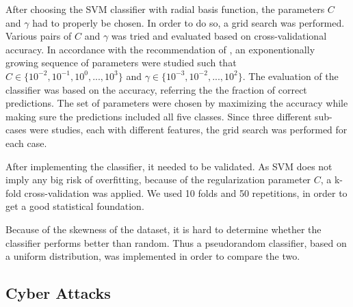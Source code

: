 After choosing the SVM classifier with radial basis function, the parameters $C$ and $\gamma$ had to properly be chosen. In order to do so, a grid search was performed. Various pairs of $C$ and $\gamma$ was tried and evaluated based on cross-validational accuracy. In accordance with the recommendation of \citet{Hsu10apractical}, an exponentionally growing sequence of parameters were studied such that $C\in\{10^{-2},10^{-1},10^{0},...,10^{3}\}$ and $\gamma\in\{10^{-3},10^{-2},...,10^{2}\}$. The evaluation of the classifier was based on the accuracy, referring the the fraction of correct predictions. The set of parameters were chosen by maximizing the accuracy while making sure the predictions included all five classes.
Since three different sub-cases were studies, each with different features, the grid search was performed for each case. 

After implementing the classifier, it needed to be validated. As SVM does not imply any big risk of overfitting, because of the regularization parameter $C$, a k-fold cross-validation was applied. We used 10 folds and 50 repetitions, in order to get a good statistical foundation.

Because of the skewness of the dataset, it is hard to determine whether the classifier performs better than random. Thus a pseudorandom classifier, based on a uniform distribution, was implemented in order to compare the two. 

\subsection{Cyber Attacks}\label{cybertattacks}



\newpage 
